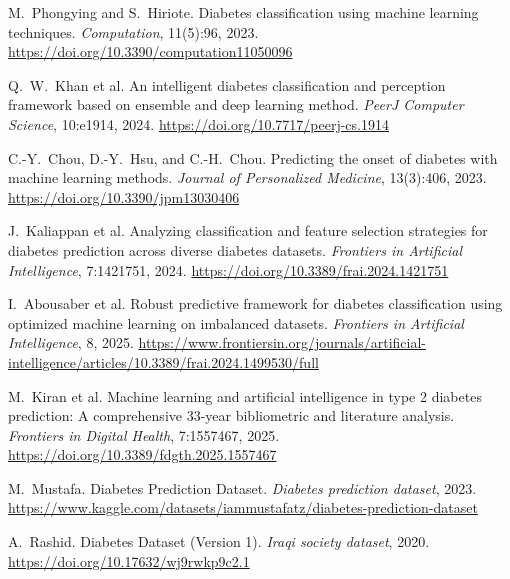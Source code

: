 \documentclass[10pt]{scrartcl}
\begin{document}
\begin{thebibliography}{}
\small



M.~Phongying and S.~Hiriote.  
\newblock Diabetes classification using machine learning techniques.  
\newblock \emph{Computation}, 11(5):96, 2023.  
\newblock \url{https://doi.org/10.3390/computation11050096}

Q.~W.~Khan et al.  
\newblock An intelligent diabetes classification and perception framework based on ensemble and deep learning method.  
\newblock \emph{PeerJ Computer Science}, 10:e1914, 2024.  
\newblock \url{https://doi.org/10.7717/peerj-cs.1914}

C.-Y.~Chou, D.-Y.~Hsu, and C.-H.~Chou.  
\newblock Predicting the onset of diabetes with machine learning methods.  
\newblock \emph{Journal of Personalized Medicine}, 13(3):406, 2023.  
\newblock \url{https://doi.org/10.3390/jpm13030406}

J.~Kaliappan et al.  
\newblock Analyzing classification and feature selection strategies for diabetes prediction across diverse diabetes datasets.  
\newblock \emph{Frontiers in Artificial Intelligence}, 7:1421751, 2024.  
\newblock \url{https://doi.org/10.3389/frai.2024.1421751}

I.~Abousaber et al.
\newblock Robust predictive framework for diabetes classification using optimized machine learning on imbalanced datasets.
\newblock \emph{Frontiers in Artificial Intelligence}, 8, 2025.
\newblock \url{https://www.frontiersin.org/journals/artificial-intelligence/articles/10.3389/frai.2024.1499530/full}

M.~Kiran et al.
\newblock Machine learning and artificial intelligence in type 2 diabetes prediction: A comprehensive 33-year bibliometric and literature analysis.
\newblock \emph{Frontiers in Digital Health}, 7:1557467, 2025.
\newblock \url{https://doi.org/10.3389/fdgth.2025.1557467}


M.~Mustafa.  
\newblock Diabetes Prediction Dataset.  
\newblock \emph{Diabetes prediction dataset}, 2023.  
\newblock \url{https://www.kaggle.com/datasets/iammustafatz/diabetes-prediction-dataset}

A.~Rashid.  
\newblock Diabetes Dataset (Version 1).  
\newblock \emph{Iraqi society dataset}, 2020.  
\newblock \url{https://doi.org/10.17632/wj9rwkp9c2.1}


\end{thebibliography}
\end{document}
